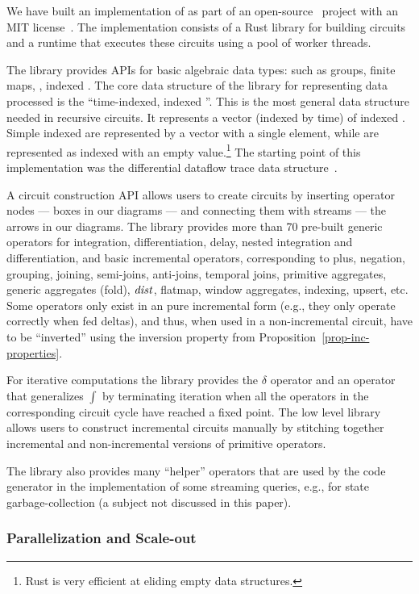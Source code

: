 We have built an implementation of \dbsp as part of an
open-source~\cite{dbsp-repo} project with an MIT
license~\cite{dbsp-crate}.  The implementation consists of a Rust
library for building circuits and a runtime that executes these
circuits using a pool of worker threads.

The library provides APIs for basic algebraic data types: such as
groups, finite maps, \zrs, indexed \zrs.  The core data structure of
the library for representing data processed is the ``time-indexed,
indexed \zr''.  This is the most general data structure needed in
recursive circuits.  It represents a vector (indexed by time) of
indexed \zrs.  Simple indexed \zrs are represented by a vector with a
single element, while \zrs are represented as indexed \zrs with an
empty value.\footnote{Rust is very efficient at eliding empty data
structures.}  The starting point of this implementation was the
differential dataflow trace data structure~\cite{dd-crate}.

A circuit construction API allows users to create \dbsp circuits by
inserting operator nodes --- boxes in our diagrams --- and connecting
them with streams --- the arrows in our diagrams.  The library
provides more than 70 pre-built generic operators for integration,
differentiation, delay, nested integration and differentiation, and
basic \zr incremental operators, corresponding to plus, negation,
grouping, joining, semi-joins, anti-joins, temporal joins, primitive
aggregates, generic aggregates (fold), $\mathit{dist}$, flatmap, window
aggregates, indexing, upsert, etc.  Some operators only exist in an
pure incremental form (e.g., they only operate correctly when fed
deltas), and thus, when used in a non-incremental circuit, have to be
``inverted'' using the inversion property from
Proposition~\ref{prop-inc-properties}.

For iterative computations the library provides the $\delta$ operator
and an operator that generalizes $\int$ by terminating iteration when
all the operators in the corresponding circuit cycle have reached a
fixed point.  The low level library allows users to construct
incremental circuits manually by stitching together incremental and
non-incremental versions of primitive operators.

The library also provides many ``helper'' operators that are used by
the code generator in the implementation of some streaming queries,
e.g., for state garbage-collection (a subject not discussed in this
paper).

\subsubsection{Parallelization and Scale-out}

